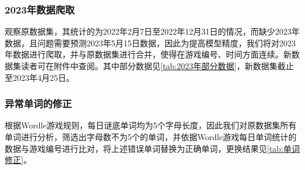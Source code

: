 \documentclass{MathModeling}
\begin{document}
	\subsubsection{2023年数据爬取}
观察原数据集，其统计的为2022年2月7日至2022年12月31日的情况，而缺少2023年数据，且问题需要预测2023年5月15日数据，因此为提高模型精度，我们将对2023年数据进行爬取，并与原数据集进行合并，使得在游戏编号、时间方面连续。新数据集读者可在附件中查阅。其中部分数据见\textcolor{blue}{\cref{tab:2023年部分数据}}，新数据集截止至2023年4月25日。
\begin{table}[H]
	\centering
	\caption{2023年部分数据}
	\label{tab:2023年部分数据}
\end{table}
  
	\subsubsection{异常单词的修正}
	根据Wordle游戏规则，每日谜底单词均为5个字母长度，因此我们对原数据集所有单词进行分析，筛选出字母数不为5个的单词，并依据Wordle游戏每日单词统计的数据与游戏编号进行比对，将上述错误单词替换为正确单词，更换结果见\textcolor{blue}{\cref{tab:单词修正}}。
\begin{table}[H]
	\centering
	\caption{单词修正}
	\label{tab:单词修正}
\end{table}
  
\end{document}
